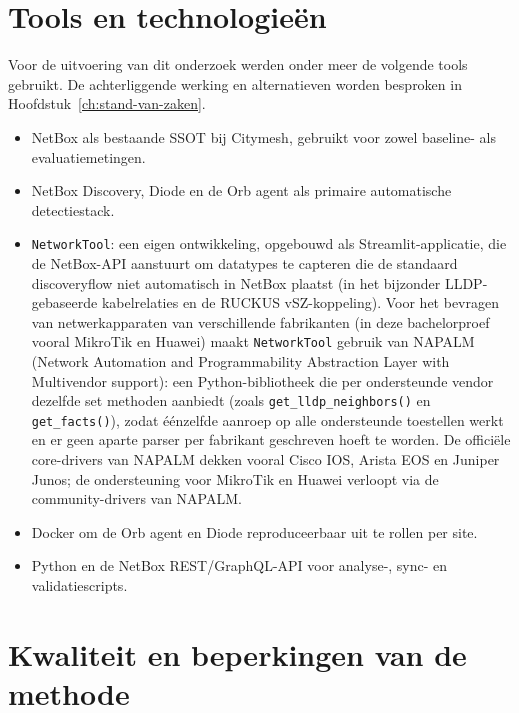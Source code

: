\section{Tools en technologieën}

Voor de uitvoering van dit onderzoek werden onder meer de volgende tools gebruikt. De achterliggende werking en alternatieven worden besproken in Hoofdstuk~\ref{ch:stand-van-zaken}.

\begin{itemize}
  \item NetBox als bestaande SSOT bij Citymesh, gebruikt voor zowel baseline- als evaluatiemetingen\autocite{NetBoxOSS}.
  \item NetBox Discovery, Diode en de Orb agent als primaire automatische detectiestack\autocite{NetBoxDiscoveryDocs,DiodeDocs,NetBoxLabsOrbAgent}.
  \item \texttt{NetworkTool}: een eigen ontwikkeling, opgebouwd als Streamlit-applicatie\autocite{Streamlit}, die de NetBox-API aanstuurt om datatypes te capteren die de standaard discoveryflow niet automatisch in NetBox plaatst (in het bijzonder LLDP-gebaseerde kabelrelaties en de RUCKUS vSZ-koppeling\autocite{RuckusVSZ}). Voor het bevragen van netwerkapparaten van verschillende fabrikanten (in deze bachelorproef vooral MikroTik en Huawei) maakt \texttt{NetworkTool} gebruik van NAPALM (Network Automation and Programmability Abstraction Layer with Multivendor support)\autocite{NAPALM}: een Python-bibliotheek die per ondersteunde vendor dezelfde set methoden aanbiedt (zoals \texttt{get\_lldp\_neighbors()} en \texttt{get\_facts()}), zodat \'e\'enzelfde aanroep op alle ondersteunde toestellen werkt en er geen aparte parser per fabrikant geschreven hoeft te worden. De officiële core-drivers van NAPALM dekken vooral Cisco IOS, Arista EOS en Juniper Junos\autocite{NAPALM}; de ondersteuning voor MikroTik en Huawei verloopt via de community-drivers van NAPALM\autocite{NAPALMCommunityDrivers}.
  \item Docker om de Orb agent en Diode reproduceerbaar uit te rollen per site.
  \item Python en de NetBox REST/GraphQL-API voor analyse-, sync- en validatiescripts.
\end{itemize}

\section{Kwaliteit en beperkingen van de methode}

